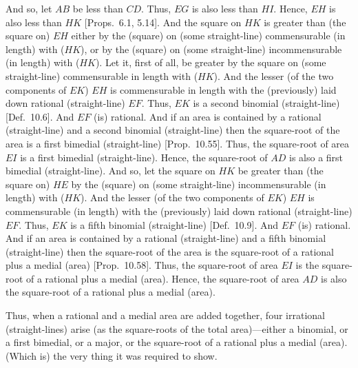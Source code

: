 \begin{Parallel}{}{}
{ And so, let $AB$ be less than $CD$. Thus, $EG$ is also less
 than $HI$. Hence, $EH$ is also less than $HK$ [Props.~6.1, 5.14].
 And the square on $HK$ is greater than (the square on) $EH$ either
 by the (square) on (some straight-line) commensurable (in length)
 with ($HK$), or by the (square) on (some straight-line) incommensurable
 (in length) with ($HK$). Let it, first of all, be greater by the square
 on (some straight-line) commensurable in length with ($HK$).
 And the lesser (of the two components of $EK$) $EH$ is  commensurable in length with the
 (previously) laid down rational (straight-line) $EF$. Thus, $EK$
 is a second binomial (straight-line) [Def.~10.6]. 
 And $EF$ (is) rational. And if an area is contained by a rational (straight-line)
 and a second binomial (straight-line)  then the square-root of the area is a
 first bimedial (straight-line) [Prop.~10.55]. 
 Thus, the square-root of area $EI$ is a first bimedial (straight-line).
 Hence, the square-root of $AD$ is also a first bimedial (straight-line).
 And so, let the square on $HK$ be greater than (the square on) $HE$
 by the (square) on (some straight-line) incommensurable (in length) with
 ($HK$). 
 And the lesser (of the two components of $EK$) $EH$ is commensurable (in length) with the (previously) laid down rational (straight-line) $EF$.  Thus, $EK$ is a fifth binomial
 (straight-line) [Def.~10.9]. And $EF$ (is) rational. And if an area is
 contained by a rational (straight-line) and a fifth binomial (straight-line) 
 then the square-root of the area is the square-root of a rational plus
 a medial (area) [Prop.~10.58]. Thus, the square-root of area $EI$ is the square-root of a rational plus a medial (area). Hence,
 the square-root of area $AD$ is also the square-root of a rational plus
 a medial (area).
 
 Thus, when a rational and a medial area are added together, four irrational
(straight-lines) arise (as the square-roots of the
total area)---either a binomial, or a first bimedial, or a major, or the
square-root of a rational plus a medial (area). (Which is) the very thing
it was required to show.}
\end{Parallel}

